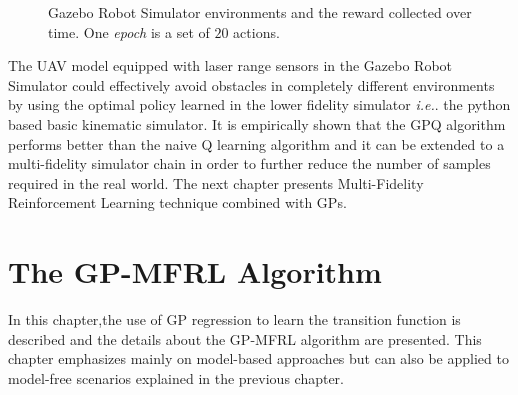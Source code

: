 \documentclass[12pt]{report}
\newcommand{\ie}{\textit{i.e.}}
\begin{document}
\begin{figure}[H]
    
    \caption {Gazebo Robot Simulator environments and the reward collected over time. One \textit{epoch} is a set of $20$ actions.} 
   \label{fig:gazebo_gpq_sim}
\end{figure}

The UAV model equipped with laser range sensors in the Gazebo Robot Simulator could
effectively avoid obstacles in completely different environments by using the optimal policy
learned in the lower fidelity simulator \ie. the python based basic kinematic simulator. It
is empirically shown that the GPQ algorithm performs better than the naive Q learning
algorithm and it can be extended to a multi-fidelity simulator chain in order to further reduce the number of samples required in the real world. The next chapter presents Multi-Fidelity Reinforcement Learning technique combined with GPs.


\chapter{The GP-MFRL Algorithm} %
In this chapter,the use of GP regression to learn the transition function is described and the details about the GP-MFRL algorithm are presented. This chapter emphasizes mainly on model-based approaches but can also be applied to model-free scenarios explained in the previous chapter. 
\end{document}
